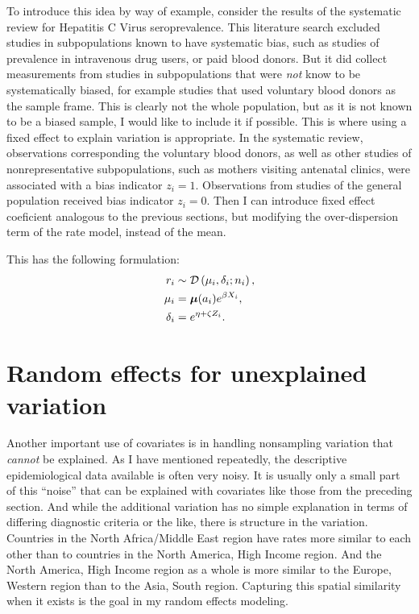 To introduce this idea by way of example, consider the results of the
systematic review for Hepatitis C Virus seroprevalence.  This
literature search excluded studies in subpopulations known to have
systematic bias, such as studies of prevalence in intravenous drug
users, or paid blood donors.  But it did collect measurements from
studies in subpopulations that were \emph{not} know to be
systematically biased, for example studies that used voluntary blood
donors as the sample frame.  This is clearly not the whole population,
but as it is not known to be a biased sample, I would like to include
it if possible.  This is where using a fixed effect to explain
variation is appropriate. In the systematic review, observations corresponding
the voluntary blood donors, as well as other studies of nonrepresentative
subpopulations, such as mothers visiting antenatal clinics, were
associated with a
bias indicator $z_i = 1$.  Observations from studies of the general
population received bias indicator $z_i = 0$.  Then I can 
introduce fixed effect coeficient analogous to the previous sections,
but modifying the over-dispersion term of the rate model, instead of
the mean.

This has the following
formulation:
\begin{align*}
r_i &\sim \mathcal{D}\left(\mu_i, \delta_i; n_i\right),\\
\mu_i &= \boldsymbol{\mu}(a_i)e^{\beta X_i},\\
\delta_i &= e^{\eta + \zeta Z_i}.
\end{align*}

\section{Random effects for unexplained variation}
Another important use of covariates is in handling nonsampling
variation that \emph{cannot} be explained. As I have mentioned
repeatedly, the descriptive epidemiological data available is often
very noisy.  It is usually only a small part of this ``noise'' that
can be explained with covariates like those from the preceding
section. And while the additional variation has no simple explanation
in terms of differing diagnostic criteria or the like, there is
structure in the variation. Countries in the North Africa/Middle East
region have rates more similar to each other than to countries in the
North America, High Income region.  And the North America, High Income
region as a whole is more similar to the Europe, Western region than
to the Asia, South region.  Capturing this spatial similarity when it
exists is the goal in my random effects modeling.

